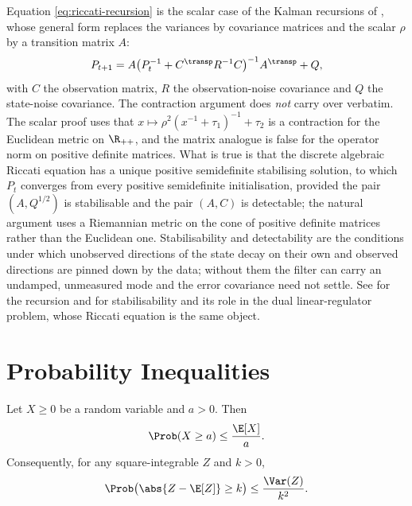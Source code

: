 Equation \eqref{eq:riccati-recursion} is the scalar case of the Kalman
recursions of \textcite[Sec.~9.4, p.~270]{brockwell2016introduction}, whose
general form replaces the variances by covariance matrices and the scalar $\rho$
by a transition matrix $A$:
\[
	P_{t+1}=A\bigl(P_t^{-1}+C^{\transp}R^{-1}C\bigr)^{-1}A^{\transp}+Q,
\]
with $C$ the observation matrix, $R$ the observation-noise covariance and $Q$ the
state-noise covariance. The contraction argument does \emph{not} carry over
verbatim. The scalar proof uses that $x\mapsto\rho^2(x^{-1}+\tau_1)^{-1}+\tau_2$
is a contraction for the Euclidean metric on $\R_{++}$, and the matrix analogue
is false for the operator norm on positive definite matrices. What is true is
that the discrete algebraic Riccati equation has a unique positive semidefinite
stabilising solution, to which $P_t$ converges from every positive semidefinite
initialisation, provided the pair $(A,Q^{1/2})$ is stabilisable and the pair
$(A,C)$ is detectable; the natural argument uses a Riemannian metric on the cone
of positive definite matrices rather than the Euclidean one. Stabilisability and
detectability are the conditions under which unobserved directions of the state
decay on their own and observed directions are pinned down by the data; without
them the filter can carry an undamped, unmeasured mode and the error covariance
need not settle. See \textcite[Sec.~9.4, p.~270]{brockwell2016introduction} for
the recursion and \textcite[Sec.~5.4, pp.~136--137]{ljungqvist2018recursive} for
stabilisability and its role in the dual linear-regulator problem, whose Riccati
equation is the same object.

\section{Probability Inequalities}\label{sec:prob-inequalities}

\begin{theorem}\label{thm:markov}
	Let $X\geq0$ be a random variable and $a>0$. Then
	\begin{equation}\label{eq:markov}
		\Prob(X\geq a)\leq\frac{\E[X]}{a} .
	\end{equation}
	Consequently, for any square-integrable $Z$ and $k>0$,
	\begin{equation}\label{eq:chebyshev}
		\Prob\bigl(\abs{Z-\E[Z]}\geq k\bigr)\leq\frac{\Var(Z)}{k^{2}} .
	\end{equation}
\end{theorem}

